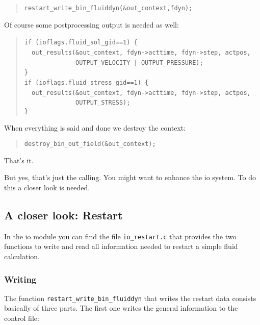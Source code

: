 \begin{quote}
\texttt{restart{\_}write{\_}bin{\_}fluiddyn({\&}out{\_}context,fdyn); }
\end{quote}
Of course some postprocessing output is needed as well: 

\begin{quote}
\texttt{if~(ioflags.fluid{\_}sol{\_}gid==1)~{\{}~}~\\
 \texttt{~~out{\_}results({\&}out{\_}context,~fdyn->acttime,~fdyn->step,~actpos,~}~\\
 \texttt{~~~~~~~~~~~~~~OUTPUT{\_}VELOCITY~|~OUTPUT{\_}PRESSURE);~}~\\
 \texttt{{\}}~}~\\
 \texttt{if~(ioflags.fluid{\_}stress{\_}gid==1)~{\{}~}~\\
 \texttt{~~out{\_}results({\&}out{\_}context,~fdyn->acttime,~fdyn->step,~actpos,~}~\\
 \texttt{~~~~~~~~~~~~~~OUTPUT{\_}STRESS);~}~\\
 \texttt{{\}} }
\end{quote}
When everything is said and done we destroy the context: 

\begin{quote}
\texttt{destroy{\_}bin{\_}out{\_}field({\&}out{\_}context); }
\end{quote}
That's it.

But yes, that's just the calling. You might want to enhance the io
system. To do this a closer look is needed.


\subsection{A closer look: Restart}

In the io module you can find the file \texttt{io{\_}restart.c}
that provides the two functions to write and read all information
needed to restart a simple fluid calculation.


\subsubsection{Writing}

The function \texttt{restart{\_}write{\_}bin{\_}fluiddyn} that
writes the restart data consists basically of three parts. The first
one writes the general information to the control file: 

